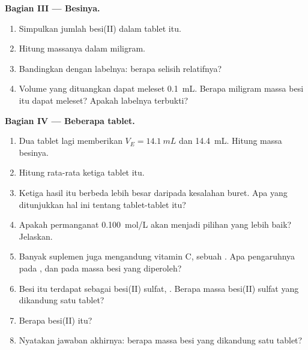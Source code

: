 \begin{problem}
\medskip
\noindent\textbf{Bagian III --- Besinya.}
\begin{enumerate}[resume]
  \item Simpulkan jumlah besi(II) dalam tablet itu.
  \item Hitung massanya dalam miligram.
  \item Bandingkan dengan labelnya: berapa selisih relatifnya?
  \item Volume yang dituangkan dapat meleset \qty{0.1}{mL}. Berapa
        miligram massa besi itu dapat meleset? Apakah labelnya terbukti?
\end{enumerate}

\medskip
\noindent\textbf{Bagian IV --- Beberapa tablet.}
\begin{enumerate}[resume]
  \item Dua tablet lagi memberikan $V_E = \qty{14.1}{mL}$ dan
        \qty{14.4}{mL}. Hitung massa besinya.
  \item Hitung rata-rata ketiga tablet itu.
  \item Ketiga hasil itu berbeda lebih besar daripada kesalahan buret.
        Apa yang ditunjukkan hal ini tentang tablet-tablet itu?
  \item Apakah permanganat \qty{0.100}{mol/L} akan menjadi pilihan yang
        lebih baik? Jelaskan.
  \item Banyak suplemen juga mengandung vitamin C, sebuah . Apa
        pengaruhnya pada , dan pada massa besi yang diperoleh?
  \item Besi itu terdapat sebagai besi(II) sulfat, . Berapa
        massa besi(II) sulfat yang dikandung satu tablet?
  \item Berapa  besi(II) itu?
  \item Nyatakan jawaban akhirnya: berapa massa besi yang dikandung satu
        tablet?
\end{enumerate}
\end{problem}
